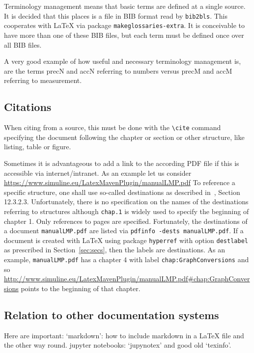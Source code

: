 \documentclass[a4paper,12pt]{article}
\begin{document}
Terminology management means that basic terms are defined at a single source. 
It is decided that this places is a file in BIB format read by \texttt{bib2bls}. 
This cooperates with \LaTeX{} via package \texttt{makeglossaries-extra}. 
It is conceivable to have more than one of these BIB files, 
but each term must be defined once over all BIB files. 

A very good example of how useful and necessary terminology management is, 
are the terms \gls{precN} and \gls{accN} referring to numbers 
versus \gls{precM} and \gls{accM} referring to measurement. 

\subsection{Citations}

When citing from a source, this must be done with the \texttt{\textbackslash cite} 
command specifying the document following the chapter or section or other structure, 
like listing, table or figure. 

Sometimes it is advantageous to add a link to the according PDF file 
if this is accessible via internet/intranet. 
As an example let us consider \url{https://www.simuline.eu/LatexMavenPlugin/manualLMP.pdf}
To reference a specific structure, 
one shall use so-called destinations as described in~\cite{Pdf17}, 
Section 12.3.2.3. 
Unfortunately, there is no specification on the names of the destinations 
referring to structures 
although \texttt{chap.1} is widely used to specify the beginning of chapter 1. 
Only references to pages are specified. 
Fortunately, the destinations of a document \texttt{manualLMP.pdf} 
are listed via \texttt{pdfinfo -dests manualLMP.pdf}. 
If a document is created with \LaTeX{} using package \texttt{hyperref} 
with option \texttt{destlabel} as prescribed in Section~\ref{sec:secs}, 
then the labels are destinations. 
As an example, \texttt{manualLMP.pdf} has a chapter 4 with label \texttt{chap:GraphConversions}
and so \url{http://www.simuline.eu/LatexMavenPlugin/manualLMP.pdf#chap:GraphConversions} 
points to the beginning of that chapter. 

\subsection{Relation to other documentation systems}

Here are important: 
`markdown': how to include markdown in a \LaTeX{} file and the other way round. 
jupyter notebooks: `jupynotex'
and good old `texinfo'. 



\printunsrtglossaries%

\end{document}
